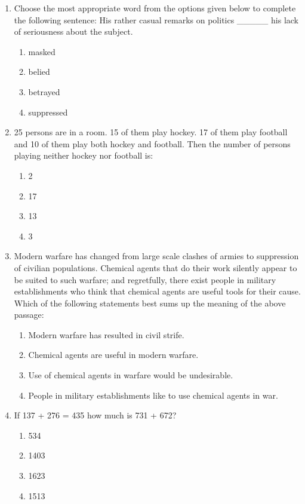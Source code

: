 \documentclass[journal,12pt,onecolumn]{IEEEtran}
\begin{document}
\begin{enumerate}
\item Choose the most appropriate word from the options given below to complete the following sentence: His rather casual remarks on politics \_\_\_\_\_ his lack of seriousness about the subject.
\begin{multicols}{2}
\begin{enumerate}
\item masked
\item belied
\item betrayed
\item suppressed
\end{enumerate}
\end{multicols}

\item 25 persons are in a room. 15 of them play hockey. 17 of them play football and 10 of them play both hockey and football. Then the number of persons playing neither hockey nor football is:
\begin{multicols}{2}
\begin{enumerate}
\item 2
\item 17
\item 13
\item 3
\end{enumerate}
\end{multicols}

\item Modern warfare has changed from large scale clashes of armies to suppression of civilian populations. Chemical agents that do their work silently appear to be suited to such warfare; and regretfully, there exist people in military establishments who think that chemical agents are useful tools for their cause. Which of the following statements best sums up the meaning of the above passage:
\begin{multicols}{2}
\begin{enumerate}
\item Modern warfare has resulted in civil strife.
\item Chemical agents are useful in modern warfare.
\item Use of chemical agents in warfare would be undesirable.
\item People in military establishments like to use chemical agents in war.
\end{enumerate}
\end{multicols}

\item If 137 + 276 = 435 how much is 731 + 672?
\begin{multicols}{2}
\begin{enumerate}
\item 534
\item 1403
\item 1623
\item 1513
\end{enumerate}
\end{multicols}


\end{enumerate}
\end{document}
